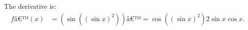 The derivative is:
\begin{align*}
fâ€™(x) &= \left( \sin((\sin x)^2) \right)â€™
=\cos((\sin x)^2) 2\sin x \cos x.
\end{align*}
